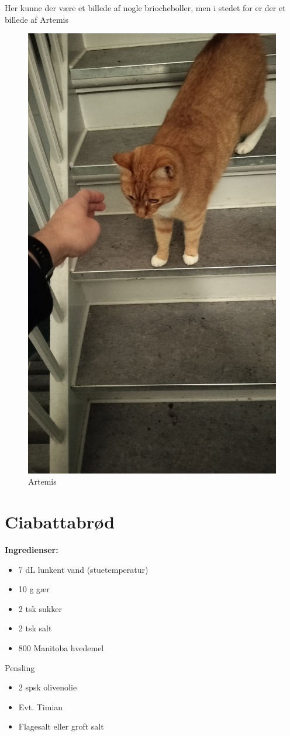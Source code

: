 \documentclass{book}
\begin{document}
\newpage Her kunne der være et billede af nogle briocheboller, men i stedet for er der et billede af Artemis
\begin{figure}
    \centering
    \includegraphics[width=0.5\linewidth]{IMG20231108195607.jpg}
    \caption{Artemis}
\end{figure}
\newpage \section{Ciabattabrød}
\begin{minipage}[t]{0.5\textwidth}
\textbf{Ingredienser:}
\begin{itemize}
    \item 7 dL lunkent vand (stuetemperatur)
    \item 10 g gær
    \item 2 tsk sukker
    \item 2 tsk salt
    \item 800 Manitoba hvedemel
\end{itemize}
Pensling
\begin{itemize}
    \item 2 spsk olivenolie
    \item Evt. Timian
    \item Flagesalt eller groft salt
\end{itemize}
\end{minipage}
\end{document}
